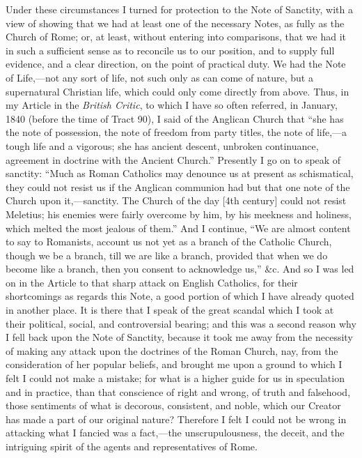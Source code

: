 Under these circumstances I turned for protection to the Note of
Sanctity, with a view of showing that we had at least one of the
necessary Notes, as fully as the Church of Rome; or, at least, without
entering into comparisons, that we had it in such a sufficient sense as
to reconcile us to our position, and to supply full evidence, and a
clear direction, on the point of practical duty. We had the Note of
Life,—not any sort of life, not such only as can come of nature, but a
supernatural Christian life, which could only come directly from above. Thus,
in my Article in the \emph{British Critic}, to which I have so
often referred, in January, 1840 (before the time of Tract 90), I
said of the Anglican Church that ``she has the note of possession,
the note of freedom from party titles, the note of life,—a tough life
and a vigorous; she has ancient descent, unbroken continuance, agreement
in doctrine with the Ancient Church.'' Presently I go on to speak of
sanctity: ``Much as Roman Catholics may denounce us at present as
schismatical, they could not resist us if the Anglican communion had but
that one note of the Church upon it,—sanctity. The Church of the day
[4th century] could not resist Meletius; his enemies were
fairly overcome by him, by his meekness and holiness, which melted the
most jealous of them.'' And I continue, ``We are almost content
to say to Romanists, account us not yet as a branch of the Catholic
Church, though we be a branch, till we are like a branch, provided that
when we do become like a branch, then you consent to acknowledge
us,'' \&c. And so I was led on in the Article to that sharp
attack on English Catholics, for their shortcomings as regards this
Note, a good portion of which I have already quoted in another place. It
is there that I speak of the great scandal which I took at their
political, social, and controversial bearing; and this was a second
reason why I fell back upon the Note of Sanctity, because it took
me away from the necessity of making any attack upon the doctrines of
the Roman Church, nay, from the consideration of her popular beliefs,
and brought me upon a ground to which I felt I could not make a mistake;
for what is a higher guide for us in speculation and in practice, than
that conscience of right and wrong, of truth and falsehood, those
sentiments of what is decorous, consistent, and noble, which our Creator
has made a part of our original nature? Therefore I felt I could not be
wrong in attacking what I fancied was a fact,—the unscrupulousness,
the deceit, and the intriguing spirit of the agents and representatives
of Rome.

